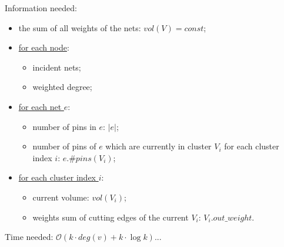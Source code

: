 \documentclass[acmsmall,nonacm,screen,review]{acmart}
\begin{document}
Information needed:
\begin{itemize}
    \item 
    the sum of all weights of the nets: $vol(V) = const$;
    \item
\underline{for each node}: 
    \begin{itemize}
        \item incident nets;
        \item weighted degree;
    \end{itemize}
    \item 
\underline{for each net $e$}: 
    \begin{itemize}
        \item 
number of pins in $e$: $|e|$;
        \item 
number of pins of $e$ which are currently in cluster $V_i$ for each cluster index $i$: $e.\#pins(V_i)$;
    \end{itemize}
    \item 
\underline{for each cluster index $i$}: 
    \begin{itemize}
        \item 
current volume: $vol(V_i)$;
        \item 
weights sum of cutting edges of the current $V_i$: $V_i.out\_weight$.
    \end{itemize}
\end{itemize}

Time needed: $\mathcal{O}(k \cdot deg(v) + k \cdot \log k)$...

\medskip
\end{document}
